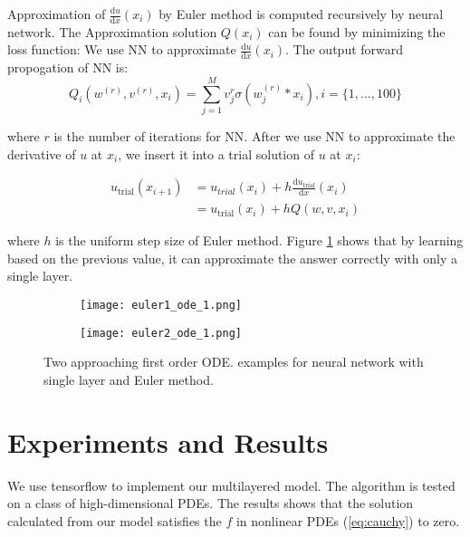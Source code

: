 \documentclass{article}
\begin{document}
Approximation of $\frac{\mathrm{d}u}{\mathrm{d}x}(x_i)$ by Euler method is computed recursively by neural network. 
The Approximation solution $Q(x_i)$ can be found by minimizing the loss function:
We use NN to approximate $\frac{\mathrm{d}u}{\mathrm{d}x}(x_i)$. The output forward propogation of NN is:
\begin{equation}
Q_i (w^{(r)},v^{(r)},x_i)=  \sum_{j=1}^{M}  v_{j}^{r}\sigma (w_{j}^{(r)}*x_i), i = \{1, \dots, 100\}
\end{equation}

\medspace \noindent
where $r$ is the number of iterations for NN. 
\medspace \noindent
After we use NN to approximate the derivative of $u$ at $x_i$, we insert it into a trial solution of $u$ at $x_i$:  

\begin{equation}
\begin{aligned}
u_{\text{trial}}(x_{i+1}) &= u_{trial}(x_{i}) +h\frac{\mathrm{d}u_{\text{trial}}}{\mathrm{d}x}(x_i) \\
&=  u_{\text{trial}}(x_{i}) +hQ(w,v,x_i)
\end{aligned}
\end{equation}

\medspace \noindent
where $h$ is the uniform step size of Euler method.  
Figure \ref{fig:ode_d1} shows that by learning based on the previous value, it can approximate the answer correctly with only a single layer.
\begin{figure}[h]
	\begin{subfigure}{0.5\textwidth}
	\texttt{[image: euler1\_ode\_1.png]}
	\end{subfigure}
\begin{subfigure}{0.5\textwidth}
	\texttt{[image: euler2\_ode\_1.png]}
\end{subfigure}
	\caption{Two approaching first order ODE. examples for neural network with single layer and Euler method.}
	
\label{fig:ode_d1}
\end{figure}




\section{Experiments and Results}

We use tensorflow to implement our multilayered model. The algorithm is tested on a class of high-dimensional PDEs. The results shows that the solution calculated from our model satisfies the $f$ in nonlinear PDEs (\ref{eq:cauchy}) to zero.
\end{document}
